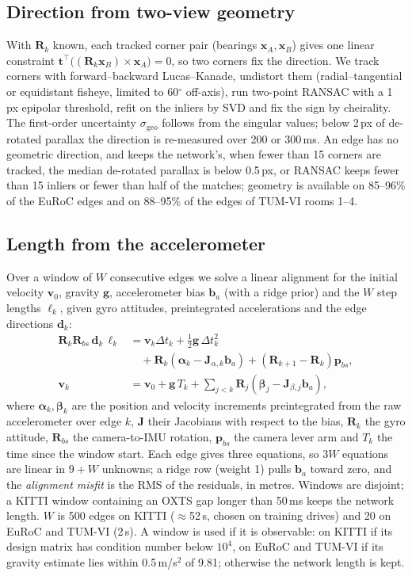 \documentclass[letterpaper,journal]{IEEEtran}
\begin{document}
\subsection{Direction from two-view geometry}
With $\mathbf{R}_k$ known, each tracked corner pair (bearings $\mathbf{x}_A,\mathbf{x}_B$) gives one linear constraint $\mathbf{t}^\top\big((\mathbf{R}_k\mathbf{x}_B)\times\mathbf{x}_A\big)=0$, so two corners fix the direction. We track corners with forward--backward Lucas--Kanade, undistort them (radial--tangential or equidistant fisheye, limited to 60$^\circ$ off-axis), run two-point RANSAC with a 1\,px epipolar threshold, refit on the inliers by SVD and fix the sign by cheirality. The first-order uncertainty $\sigma_{\mathrm{geo}}$ follows from the singular values; below 2\,px of de-rotated parallax the direction is re-measured over 200 or 300\,ms. An edge has no geometric direction, and keeps the network's, when fewer than 15 corners are tracked, the median de-rotated parallax is below 0.5\,px, or RANSAC keeps fewer than 15 inliers or fewer than half of the matches; geometry is available on 85--96\% of the EuRoC edges and on 88--95\% of the edges of TUM-VI rooms 1--4.

\subsection{Length from the accelerometer}
Over a window of $W$ consecutive edges we solve a linear alignment \cite{Qin2017} for the initial velocity $\mathbf v_0$, gravity $\mathbf g$, accelerometer bias $\mathbf b_a$ (with a ridge prior) and the $W$ step lengths $\ell_k$, given gyro attitudes, preintegrated accelerations and the edge directions $\mathbf d_k$:
\begin{align}
\mathbf R_k\mathbf R_{bs}\,\mathbf d_k\,\ell_k &= \mathbf v_k\Delta t_k+\tfrac12\mathbf g\,\Delta t_k^2\nonumber\\
&\quad+\mathbf R_k(\boldsymbol\alpha_k-\mathbf J_{\alpha,k}\mathbf b_a)+(\mathbf R_{k+1}-\mathbf R_k)\mathbf p_{bs},\label{eq:align}\\
\mathbf v_k &= \mathbf v_0+\mathbf g\,T_k+\textstyle\sum_{j<k}\mathbf R_j(\boldsymbol\beta_j-\mathbf J_{\beta,j}\mathbf b_a),\nonumber
\end{align}
where $\boldsymbol\alpha_k,\boldsymbol\beta_k$ are the position and velocity increments preintegrated from the raw accelerometer over edge $k$, $\mathbf J$ their Jacobians with respect to the bias, $\mathbf R_k$ the gyro attitude, $\mathbf R_{bs}$ the camera-to-IMU rotation, $\mathbf p_{bs}$ the camera lever arm and $T_k$ the time since the window start. Each edge gives three equations, so $3W$ equations are linear in $9+W$ unknowns; a ridge row (weight 1) pulls $\mathbf b_a$ toward zero, and the \emph{alignment misfit} is the RMS of the residuals, in metres. Windows are disjoint; a KITTI window containing an OXTS gap longer than 50\,ms keeps the network length. $W$ is 500 edges on KITTI ($\approx$52\,s, chosen on training drives) and 20 on EuRoC and TUM-VI (2\,s). A window is used if it is observable: on KITTI if its design matrix has condition number below $10^4$, on EuRoC and TUM-VI if its gravity estimate lies within 0.5\,m/s$^2$ of 9.81; otherwise the network length is kept.
\end{document}
